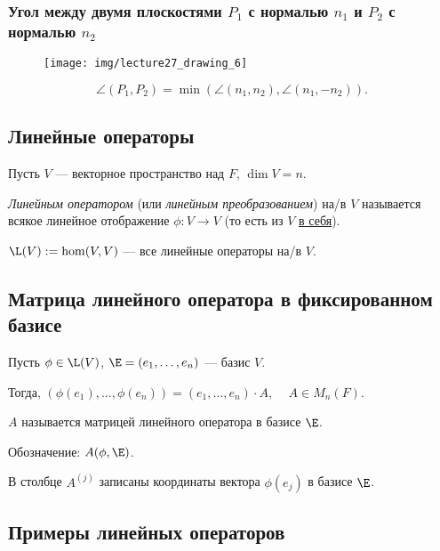 \subsubsection{Угол между двумя плоскостями $P_1$ с нормалью $n_1$ и $P_2$ с нормалью $n_2$}

{
\begin{wrapfigure}{r}{4cm}
    \vspace{-10pt}
    \texttt{[image: img/lecture27\_drawing\_6]}
\end{wrapfigure}

\begin{equation*}
    \angle(P_1, P_2) = \min (\angle(n_1, n_2), \angle(n_1, -n_2))
.\end{equation*}
}


\subsection{Линейные операторы}

Пусть $V$ --- векторное пространство над $F$, $\dim V = n$.

\begin{definition}
\textit{Линейным оператором} (или \textit{линейным преобразованием}) на/в $V$ называется всякое линейное отображение $\phi \colon V \to V$ (то есть из $V$ \underline{\underline{в себя}}).
\end{definition}

$\L(V) := \hom(V, V)$ --- все линейные операторы на/в $V$.


\subsection{Матрица линейного оператора в фиксированном базисе}

Пусть $\phi \in \L(V)$, $\E = (e_1, \dots, e_n)$ --- базис $V$.

Тогда, $(\phi(e_1), \dots, \phi(e_n)) = (e_1, \dots, e_n) \cdot A$, $\quad A \in M_{n}(F)$.

$A$ называется матрицей линейного оператора в базисе $\E$.

Обозначение: $A(\phi, \E)$.

В столбце $A^{(j)}$ записаны координаты вектора $\phi(e_j)$ в базисе $\E$.


\subsection{Примеры линейных операторов}

